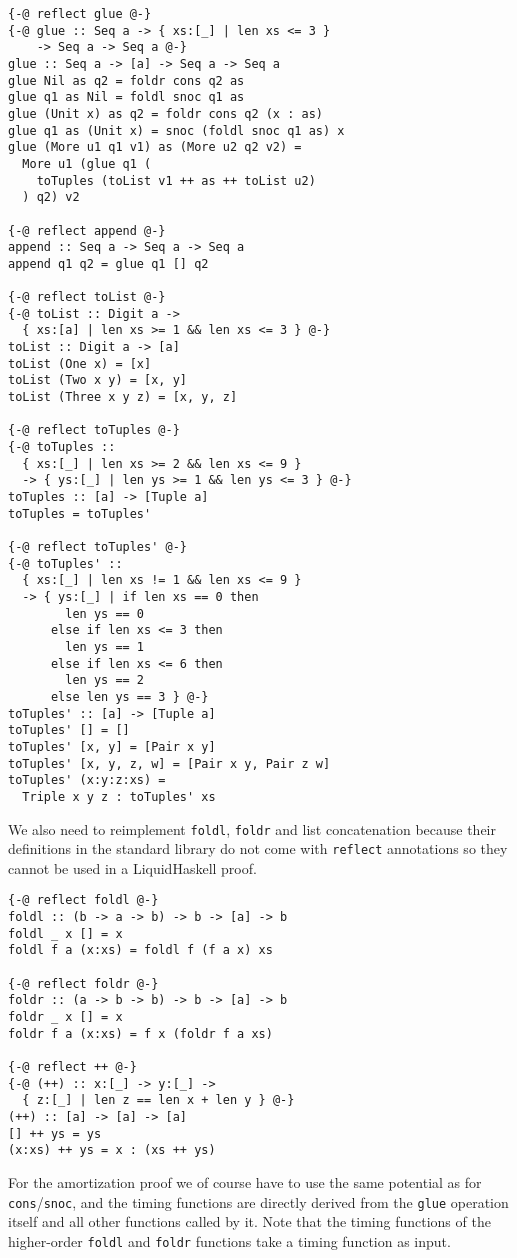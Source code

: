 \documentclass[sigplan,screen]{acmart}
\begin{document}
\begin{lstlisting}
{-@ reflect glue @-}
{-@ glue :: Seq a -> { xs:[_] | len xs <= 3 }
    -> Seq a -> Seq a @-}
glue :: Seq a -> [a] -> Seq a -> Seq a
glue Nil as q2 = foldr cons q2 as
glue q1 as Nil = foldl snoc q1 as
glue (Unit x) as q2 = foldr cons q2 (x : as)
glue q1 as (Unit x) = snoc (foldl snoc q1 as) x
glue (More u1 q1 v1) as (More u2 q2 v2) =
  More u1 (glue q1 (
    toTuples (toList v1 ++ as ++ toList u2)
  ) q2) v2

{-@ reflect append @-}
append :: Seq a -> Seq a -> Seq a
append q1 q2 = glue q1 [] q2

{-@ reflect toList @-}
{-@ toList :: Digit a ->
  { xs:[a] | len xs >= 1 && len xs <= 3 } @-}
toList :: Digit a -> [a]
toList (One x) = [x]
toList (Two x y) = [x, y]
toList (Three x y z) = [x, y, z]

{-@ reflect toTuples @-}
{-@ toTuples ::
  { xs:[_] | len xs >= 2 && len xs <= 9 }
  -> { ys:[_] | len ys >= 1 && len ys <= 3 } @-}
toTuples :: [a] -> [Tuple a]
toTuples = toTuples'

{-@ reflect toTuples' @-}
{-@ toTuples' ::
  { xs:[_] | len xs != 1 && len xs <= 9 }
  -> { ys:[_] | if len xs == 0 then
        len ys == 0
      else if len xs <= 3 then
        len ys == 1
      else if len xs <= 6 then
        len ys == 2
      else len ys == 3 } @-}
toTuples' :: [a] -> [Tuple a]
toTuples' [] = []
toTuples' [x, y] = [Pair x y]
toTuples' [x, y, z, w] = [Pair x y, Pair z w]
toTuples' (x:y:z:xs) =
  Triple x y z : toTuples' xs
\end{lstlisting}

We also need to reimplement \texttt{foldl}, \texttt{foldr} and list concatenation because their definitions in the standard library do not come with \texttt{reflect} annotations so they cannot be used in a LiquidHaskell proof.

\begin{lstlisting}
{-@ reflect foldl @-}
foldl :: (b -> a -> b) -> b -> [a] -> b 
foldl _ x [] = x
foldl f a (x:xs) = foldl f (f a x) xs

{-@ reflect foldr @-}
foldr :: (a -> b -> b) -> b -> [a] -> b
foldr _ x [] = x
foldr f a (x:xs) = f x (foldr f a xs)

{-@ reflect ++ @-}
{-@ (++) :: x:[_] -> y:[_] ->
  { z:[_] | len z == len x + len y } @-}
(++) :: [a] -> [a] -> [a]
[] ++ ys = ys
(x:xs) ++ ys = x : (xs ++ ys)
\end{lstlisting}

For the amortization proof we of course have to use the same potential as for \texttt{cons}/\texttt{snoc}, and the timing functions are directly derived from the \texttt{glue} operation itself and all other functions called by it. Note that the timing functions of the higher-order \texttt{foldl} and \texttt{foldr} functions take a timing function as input.
\end{document}

